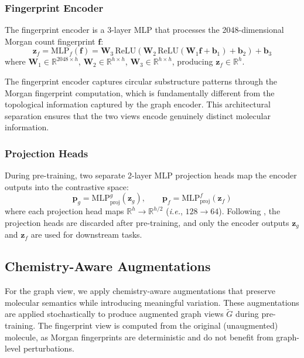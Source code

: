 \documentclass[a4paper,fleqn]{cas-sc}
\newcommand{\ie}{\textit{i.e.}}
\begin{document}
\subsubsection{Fingerprint Encoder}

The fingerprint encoder is a 3-layer MLP that processes the 2048-dimensional Morgan count fingerprint $\mathbf{f}$:
\begin{equation}\label{eq:fp_encoder}
\mathbf{z}_f = \text{MLP}_f(\mathbf{f}) = \mathbf{W}_3 \, \text{ReLU}\left(\mathbf{W}_2 \, \text{ReLU}(\mathbf{W}_1 \mathbf{f} + \mathbf{b}_1) + \mathbf{b}_2\right) + \mathbf{b}_3
\end{equation}
where $\mathbf{W}_1 \in \mathbb{R}^{2048 \times h}$, $\mathbf{W}_2 \in \mathbb{R}^{h \times h}$, $\mathbf{W}_3 \in \mathbb{R}^{h \times h}$, producing $\mathbf{z}_f \in \mathbb{R}^{h}$.

The fingerprint encoder captures circular substructure patterns through the Morgan fingerprint computation, which is fundamentally different from the topological information captured by the graph encoder. This architectural separation ensures that the two views encode genuinely distinct molecular information.

\subsubsection{Projection Heads}

During pre-training, two separate 2-layer MLP projection heads map the encoder outputs into the contrastive space:
\begin{equation}\label{eq:proj}
\mathbf{p}_g = \text{MLP}_{\text{proj}}^g(\mathbf{z}_g), \qquad
\mathbf{p}_f = \text{MLP}_{\text{proj}}^f(\mathbf{z}_f)
\end{equation}
where each projection head maps $\mathbb{R}^{h} \rightarrow \mathbb{R}^{h/2}$ (\ie, $128 \rightarrow 64$). Following \citet{chen2020simple}, the projection heads are discarded after pre-training, and only the encoder outputs $\mathbf{z}_g$ and $\mathbf{z}_f$ are used for downstream tasks.

\subsection{Chemistry-Aware Augmentations}\label{sec:augmentation}

For the graph view, we apply chemistry-aware augmentations that preserve molecular semantics while introducing meaningful variation. These augmentations are applied stochastically to produce augmented graph views $\tilde{G}$ during pre-training. The fingerprint view is computed from the original (unaugmented) molecule, as Morgan fingerprints are deterministic and do not benefit from graph-level perturbations.
\end{document}
